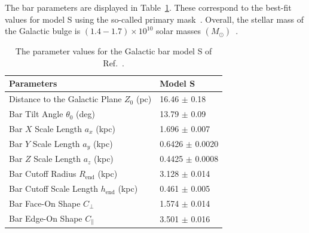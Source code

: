 \documentclass[doublespace,nopageskip]{VTthesis} %
\begin{document}
The bar parameters 
are displayed in Table~\ref{tab:modelS}. These correspond to the best-fit values for model S using the so-called primary mask~\cite{1998ApJ...492..495F}. Overall, the stellar mass of the Galactic bulge is $(1.4-1.7)\times 10^{10}$ solar masses $(M_\odot)$~\cite{2016ARA&A..54..529B}.


\begin{table}[htb]
\centering
\caption{ The parameter values for the Galactic bar model S of Ref.~\cite{1998ApJ...492..495F}.}
    \begin{tabular}{ll}
    \toprule
      Parameters & Model S \\ 
      \midrule
      Distance to the Galactic Plane $Z_0$ (pc) & 16.46 $\pm$ 0.18\\
      Bar Tilt Angle $\theta_0$ (deg) & 13.79 $\pm$ 0.09\\
      Bar $X$ Scale Length $a_x$ (kpc) & 1.696 $\pm$ 0.007 \\
      Bar $Y$ Scale Length $a_y$ (kpc) & 0.6426 $\pm$ 0.0020 \\
      Bar $Z$ Scale Length $a_z$ (kpc) & 0.4425 $\pm$ 0.0008 \\
      Bar Cutoff Radius $R_{\text{end}}$ (kpc) & 3.128 $\pm$ 0.014 \\
      Bar Cutoff Scale Length $h_{\text{end}}$ (kpc) & 0.461 $\pm$ 0.005 \\
      Bar Face-On Shape $C_\perp$ & 1.574 $\pm$ 0.014 \\
      Bar Edge-On Shape $C_\parallel$ & 3.501 $\pm$ 0.016\\
      \bottomrule
    \end{tabular}
\label{tab:modelS}
\end{table}
\end{document}
